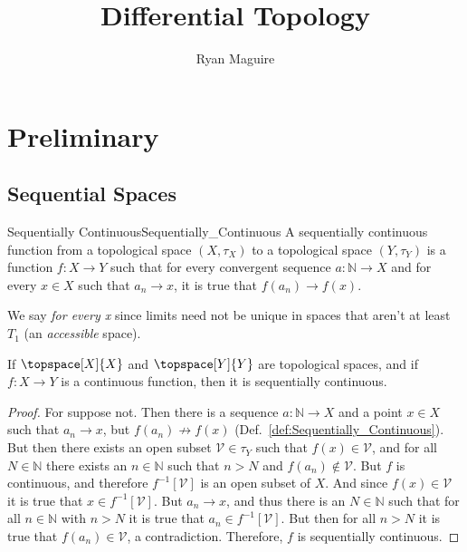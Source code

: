 \documentclass{article}                                                        %
\begin{document}
    \title{Differential Topology}
    \author{Ryan Maguire}
    \date{\vspace{-5ex}}
    \maketitle
    \tableofcontents
    \section{Preliminary}
        \subsection{Sequential Spaces}
            \begin{fdefinition}{Sequentially Continuous}{Sequentially_Continuous}
                A sequentially continuous function from a topological space
                $(X,\tau_{X})$ to a topological space $(Y,\tau_{Y})$ is a
                function $f:X\rightarrow{Y}$ such that for every convergent sequence
                $a:\mathbb{N}\rightarrow{X}$ and for every $x\in{X}$ such that
                $a_{n}\rightarrow{x}$, it is true that $f(a_{n})\rightarrow{f}(x)$.
            \end{fdefinition}
            We say \textit{for every x} since limits need not be unique in spaces
            that aren't at least $T_{1}$ (an \textit{accessible} space).
            \begin{theorem}
                \label{thm:cont_implies_seq_cont}%
                If $\topspace[X]{X}$ and $\topspace[Y]{Y}$ are topological spaces,
                and if $f:X\rightarrow{Y}$ is a continuous function, then it is
                sequentially continuous.
            \end{theorem}
            \begin{proof}
                For suppose not. Then there is a sequence
                $a:\mathbb{N}\rightarrow{X}$ and a point $x\in{X}$ such that
                $a_{n}\rightarrow{x}$, but $f(a_{n})\not\rightarrow{f}(x)$
                (Def.~\ref{def:Sequentially_Continuous}). But then there exists
                an open subset $\mathcal{V}\in\tau_{Y}$ such that
                $f(x)\in\mathcal{V}$, and for all $N\in\mathbb{N}$ there exists an
                $n\in\mathbb{N}$ such that $n>N$ and
                $f(a_{n})\notin\mathcal{V}$. But $f$ is continuous, and therefore
                $f^{\minus{1}}[\mathcal{V}]$ is an open subset of $X$. And since
                $f(x)\in\mathcal{V}$ it is true that
                $x\in{f}^{\minus{1}}[\mathcal{V}]$. But $a_{n}\rightarrow{x}$, and
                thus there is an $N\in\mathbb{N}$ such that for all
                $n\in\mathbb{N}$ with $n>N$ it is true that
                $a_{n}\in{f}^{\minus{1}}[\mathcal{V}]$. But then for all $n>N$ it is
                true that $f(a_{n})\in\mathcal{V}$, a contradiction. Therefore, $f$
                is sequentially continuous.
            \end{proof}
\end{document}
